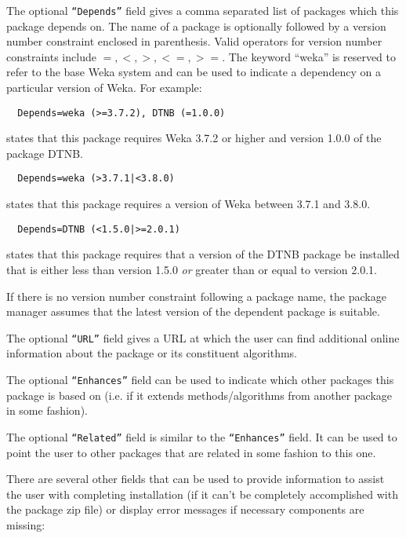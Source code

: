The optional \texttt{``Depends''} field gives a comma separated list
of packages which this package depends on. The name of a package is
optionally followed by a version number constraint enclosed in
parenthesis. Valid operators for version number constraints include
$=, <, >, <=, >=$. The keyword ``weka'' is reserved to refer to the
base Weka system and can be used to indicate a dependency on a 
particular version of Weka. For example:

\begin{verbatim}
  Depends=weka (>=3.7.2), DTNB (=1.0.0)
\end{verbatim}

states that this package requires Weka 3.7.2 or higher and version
1.0.0 of the package DTNB.

\begin{verbatim}
  Depends=weka (>3.7.1|<3.8.0)
\end{verbatim}

states that this package requires a version of Weka between 3.7.1 and
3.8.0.

\begin{verbatim}
  Depends=DTNB (<1.5.0|>=2.0.1)
\end{verbatim}

states that this package requires that a version of the DTNB package
be installed that is either less than version 1.5.0 \textit{or}
greater than or equal to version 2.0.1.

If there is no version number constraint following a package name, the
package manager assumes that the latest version of the dependent
package is suitable.

The optional \texttt{``URL''} field gives a URL at which the user can
find additional online information about the package or its constituent
algorithms.

The optional \texttt{``Enhances''} field can be used to indicate which
other packages this package is based on (i.e. if it extends
methods/algorithms from another package in some fashion).

The optional \texttt{``Related''} field is similar to the
\texttt{``Enhances''} field. It can be used to point the user to other
packages that are related in some fashion to this one.

There are several other fields that can be used to provide information
to assist the user with completing installation (if it can't be
completely accomplished with the package zip file) or display error
messages if necessary components are missing:


